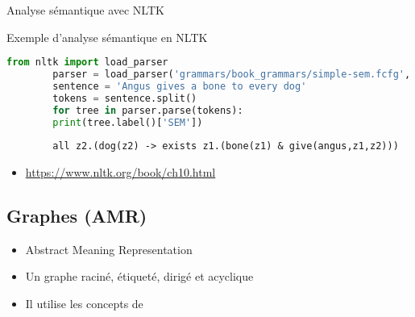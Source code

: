 \documentclass{KodeBook}
\begin{document}
Analyse sémantique avec NLTK

\begin{exampleblock}{Exemple d'analyse sémantique en NLTK}
	{\scriptsize
		\begin{lstlisting}[language=Python]
		from nltk import load_parser
		parser = load_parser('grammars/book_grammars/simple-sem.fcfg', trace=0)
		sentence = 'Angus gives a bone to every dog'
		tokens = sentence.split()
		for tree in parser.parse(tokens):
		print(tree.label()['SEM'])
		\end{lstlisting}
	}
	
	{\scriptsize\bfseries
		\begin{lstlisting}
		all z2.(dog(z2) -> exists z1.(bone(z1) & give(angus,z1,z2)))
		\end{lstlisting}
	}
	
\end{exampleblock}

\begin{itemize}
	\item \url{https://www.nltk.org/book/ch10.html}
\end{itemize}

\subsection{Graphes (AMR)}

\begin{itemize}
	\item Abstract Meaning Representation \cite{2013-banarescu-al}
	\item Un graphe raciné, étiqueté, dirigé et acyclique
	\item Il utilise les concepts de 
\end{itemize}
\end{document}
